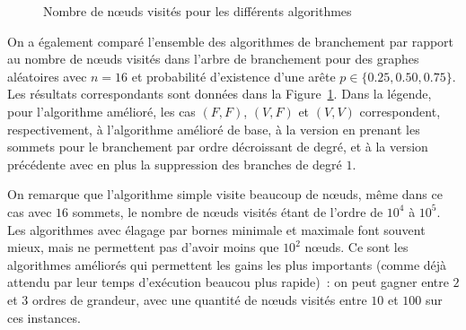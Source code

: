 \documentclass[a4paper,11pt]{amsart}
\theoremstyle{plain}
\begin{document}
\begin{figure}[ht]
\centering
\resizebox{\textwidth}{!}{}
\caption{Nombre de n\oe{}uds visités pour les différents algorithmes}
\label{FigResNoeuds}
\end{figure}

On a également comparé l'ensemble des algorithmes de branchement par rapport au nombre de n\oe{}uds visités dans l'arbre de branchement pour des graphes aléatoires avec $n = 16$ et probabilité d'existence d'une arête $p \in \{0.25, 0.50, 0.75\}$. Les résultats correspondants sont données dans la Figure~\ref{FigResNoeuds}. Dans la légende, pour l'algorithme amélioré, les cas $(F, F)$, $(V, F)$ et $(V, V)$ correspondent, respectivement, à l'algorithme amélioré de base, à la version en prenant les sommets pour le branchement par ordre décroissant de degré, et à la version précédente avec en plus la suppression des branches de degré $1$.

On remarque que l'algorithme simple visite beaucoup de n\oe{}uds, même dans ce cas avec $16$ sommets, le nombre de n\oe{}uds visités étant de l'ordre de $10^4$ à $10^5$. Les algorithmes avec élagage par bornes minimale et maximale font souvent mieux, mais ne permettent pas d'avoir moins que $10^2$ n\oe{}uds. Ce sont les algorithmes améliorés qui permettent les gains les plus importants (comme déjà attendu par leur temps d'exécution beaucou plus rapide)~: on peut gagner entre $2$ et $3$ ordres de grandeur, avec une quantité de n\oe{}uds visités entre $10$ et $100$ sur ces instances.


\end{document}
